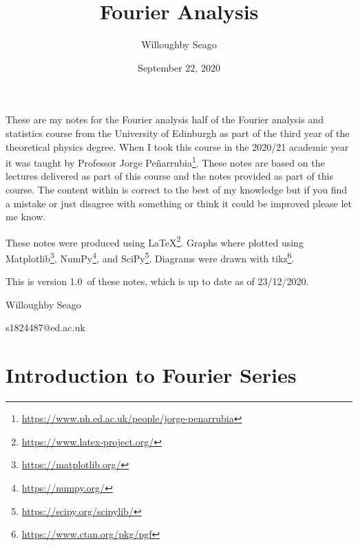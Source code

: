 \documentclass[a4paper]{article}
\author{Willoughby Seago}
\date{September 22, 2020}
\title{Fourier Analysis}
\newcommand{\notesVersion}{1.0}
\newcommand{\notesDate}{23/12/2020}
\begin{document}
    \maketitle
    These are my notes for the Fourier analysis half of the Fourier analysis and statistics course from the University of Edinburgh as part of the third year of the theoretical physics degree.
    When I took this course in the 2020/21 academic year it was taught by Professor Jorge Pe\~narrubia\footnote{\url{https://www.ph.ed.ac.uk/people/jorge-penarrubia}}.
    These notes are based on the lectures delivered as part of this course and the notes provided as part of this course.
    The content within is correct to the best of my knowledge but if you find a mistake or just disagree with something or think it could be improved please let me know.
    
    These notes were produced using \LaTeX\footnote{\url{https://www.latex-project.org/}}.
    Graphs where plotted using Matplotlib\footnote{\url{https://matplotlib.org/}}, NumPy\footnote{\url{https://numpy.org/}}, and SciPy\footnote{\url{https://scipy.org/scipylib/}}.
    Diagrams were drawn with tikz\footnote{\url{https://www.ctan.org/pkg/pgf}}.
    
    This is version \notesVersion~of these notes, which is up to date as of \notesDate.
    \begin{flushright}
        Willoughby Seago
        
        s1824487@ed.ac.uk
    \end{flushright}
    \clearpage
    \tableofcontents
    \listoffigures
    \listoftables
    \printglossary[type=\acronymtype, title=Acronyms, style=long]
    \clearpage
    \begingroup
    \let\clearpage\relax  %
    \endgroup
    \section{Introduction to Fourier Series}
\end{document}
